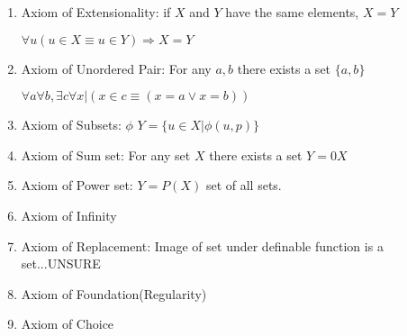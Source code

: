 \documentclass{article}
\begin{document}
\begin{enumerate}
\item Axiom of Extensionality: if $X$ and $Y$ have the same elements, $X=Y$
\vspace{1em} \\
\centerline {$\forall u (u \in X \equiv u \in Y) \Rightarrow X=Y$ }
\item Axiom of Unordered Pair: For any $a,b$ there exists a set $\{a,b\}$ 
\vspace{1em} \\
\centerline { $\forall a \forall b , \exists c \forall x | (x \in c \equiv (x = a \lor x = b))$ }
\item Axiom of Subsets: $\phi$   $Y = \{u \in X | \phi (u,p)\}$ 
\item Axiom of Sum set: For any set $X$ there exists a set $Y=0X$ 
\item Axiom of Power set: $Y = P(X)$ set of all sets.
\item Axiom of Infinity 
\item Axiom of Replacement: Image of set under definable function is a set...UNSURE

\item Axiom of Foundation(Regularity)
\item Axiom of Choice
\end{enumerate}
\newpage
\end{document}
